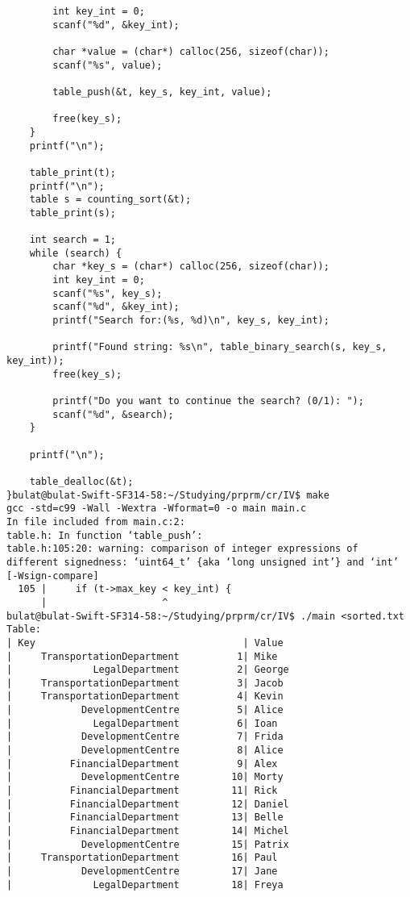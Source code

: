 \documentclass[a4paper]{article}
\newcounter{i}
\begin{document}
\begin{enumerate}[label=\textbf{\arabic*}.]
\begin{verbatim}
        int key_int = 0;
        scanf("%d", &key_int);

        char *value = (char*) calloc(256, sizeof(char));
        scanf("%s", value);

        table_push(&t, key_s, key_int, value);

        free(key_s);
    }
    printf("\n");

    table_print(t);
    printf("\n");
    table s = counting_sort(&t);
    table_print(s);

    int search = 1;
    while (search) {
        char *key_s = (char*) calloc(256, sizeof(char));
        int key_int = 0;
        scanf("%s", key_s);
        scanf("%d", &key_int);
        printf("Search for:(%s, %d)\n", key_s, key_int);

        printf("Found string: %s\n", table_binary_search(s, key_s, key_int));
        free(key_s);

        printf("Do you want to continue the search? (0/1): ");
        scanf("%d", &search);
    }

    printf("\n");

    table_dealloc(&t);
}bulat@bulat-Swift-SF314-58:~/Studying/prprm/cr/IV$ make
gcc -std=c99 -Wall -Wextra -Wformat=0 -o main main.c
In file included from main.c:2:
table.h: In function ‘table_push’:
table.h:105:20: warning: comparison of integer expressions of different signedness: ‘uint64_t’ {aka ‘long unsigned int’} and ‘int’ [-Wsign-compare]
  105 |     if (t->max_key < key_int) {
      |                    ^
bulat@bulat-Swift-SF314-58:~/Studying/prprm/cr/IV$ ./main <sorted.txt 
Table: 
| Key                                    | Value
|     TransportationDepartment          1| Mike
|              LegalDepartment          2| George
|     TransportationDepartment          3| Jacob
|     TransportationDepartment          4| Kevin
|            DevelopmentCentre          5| Alice
|              LegalDepartment          6| Ioan
|            DevelopmentCentre          7| Frida
|            DevelopmentCentre          8| Alice
|          FinancialDepartment          9| Alex
|            DevelopmentCentre         10| Morty
|          FinancialDepartment         11| Rick
|          FinancialDepartment         12| Daniel
|          FinancialDepartment         13| Belle
|          FinancialDepartment         14| Michel
|            DevelopmentCentre         15| Patrix
|     TransportationDepartment         16| Paul
|            DevelopmentCentre         17| Jane
|              LegalDepartment         18| Freya


\end{verbatim}
\end{enumerate}
\end{document}
